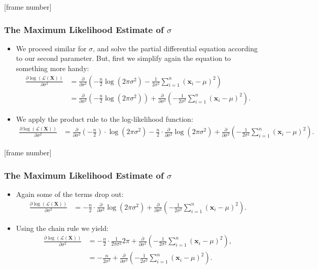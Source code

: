 \documentclass[aspectratio=169,t,xcolor=dvipsnames]{beamer}
\begin{document}
{
[frame number]
\begin{frame}
	\frametitle{The Maximum Likelihood Estimate of $\sigma$}
  \begin{itemize}
    \item We proceed similar for $\sigma$, and solve the partial differential equation according to our second parameter. But, first we simplify again the equation to something more handy:
    \begin{align}
      \frac{\partial \log\left(\mathcal{L}(\mathbf{X})\right)}{\partial \sigma^2} &= \frac{\partial}{\partial\sigma^2} \left(-\frac{n}{2} \log\left(2\pi\sigma^2\right) - \frac{1}{2\sigma^2} \sum_{i=1}^{n} (\mathbf{x}_i-\mu)^2 \right)\\
      &= \frac{\partial}{\partial\sigma^2} \left(-\frac{n}{2} \log\left(2\pi\sigma^2\right)\right) + \frac{\partial}{\partial\sigma^2}\left(-\frac{1}{2\sigma^2} \sum_{i=1}^{n} (\mathbf{x}_i-\mu)^2 \right).
    \end{align}
    \item We apply the product rule to the log-likelihood function:
    \begin{align*}
      \frac{\partial \log\left(\mathcal{L}(\mathbf{X})\right)}{\partial \sigma^2} &= \frac{\partial}{\partial\sigma^2}(-\frac{n}{2}) \cdot \log\left(2\pi\sigma^2\right) - \frac{n}{2} \cdot \frac{\partial}{\partial\sigma^2} \log\left(2\pi\sigma^2\right) + \frac{\partial}{\partial\sigma^2}\left( -\frac{1}{2\sigma^2} \sum_{i=1}^{n} (\mathbf{x}_i-\mu)^2 \right).
    \end{align*}
  \end{itemize}
\end{frame}
}


{
[frame number]
\begin{frame}
	\frametitle{The Maximum Likelihood Estimate of $\sigma$}
  \begin{itemize}
    \item Again some of the terms drop out:
    \begin{align}
      \frac{\partial \log\left(\mathcal{L}(\mathbf{X})\right)}{\partial \sigma^2} &= - \frac{n}{2} \cdot \frac{\partial}{\partial\sigma^2} \log\left(2\pi\sigma^2\right) + \frac{\partial}{\partial\sigma^2}\left( -\frac{1}{2\sigma^2} \sum_{i=1}^{n} (\mathbf{x}_i-\mu)^2 \right).
    \end{align}
    \item Using the chain rule we yield:
    \begin{align}
      \frac{\partial \log\left(\mathcal{L}(\mathbf{X})\right)}{\partial \sigma^2} &= - \frac{n}{2} \cdot \frac{1}{2\pi\sigma^2} 2\pi + \frac{\partial}{\partial\sigma^2}\left( -\frac{1}{2\sigma^2} \sum_{i=1}^{n} (\mathbf{x}_i-\mu)^2 \right),\\
      &= - \frac{n}{2\sigma^2} + \frac{\partial}{\partial\sigma^2}\left( -\frac{1}{2\sigma^2} \sum_{i=1}^{n} (\mathbf{x}_i-\mu)^2 \right).
    \end{align}
  \end{itemize}
\end{frame}
}
\end{document}
